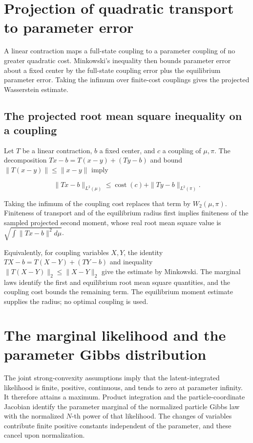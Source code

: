 \documentclass[11pt,a4paper]{article}
\begin{document}
\section{\texorpdfstring{Projection of quadratic transport to parameter error}{Projection of quadratic transport to parameter error}}


A linear contraction maps a full-state coupling to a parameter coupling of no greater quadratic cost. Minkowski’s inequality then bounds parameter error about a fixed center by the full-state coupling error plus the equilibrium parameter error. Taking the infimum over finite-cost couplings gives the projected Wasserstein estimate.



\subsection{\texorpdfstring{The projected root mean square inequality on a coupling}{The projected root mean square inequality on a coupling}}


Let \(T\) be a linear contraction, \(b\) a fixed center, and \(c\) a coupling of \(\mu,\pi\). The decomposition \(Tx-b=T(x-y)+(Ty-b)\) and bound \(\|T(x-y)\|\le\|x-y\|\) imply

\[\|Tx-b\|_{L^2(\mu)}\le\operatorname{cost}(c)+\|Ty-b\|_{L^2(\pi)}.\]

Taking the infimum of the coupling cost replaces that term by \(W_2(\mu,\pi)\). Finiteness of transport and of the equilibrium radius first implies finiteness of the sampled projected second moment, whose real root mean square value is \(\sqrt{\int\|Tx-b\|^2d\mu}\).



Equivalently, for coupling variables \(X,Y\), the identity \(TX-b=T(X-Y)+(TY-b)\) and inequality \(\|T(X-Y)\|_2\le\|X-Y\|_2\) give the estimate by Minkowski. The marginal laws identify the first and equilibrium root mean square quantities, and the coupling cost bounds the remaining term. The equilibrium moment estimate supplies the radius; no optimal coupling is used.



\section{\texorpdfstring{The marginal likelihood and the parameter Gibbs distribution}{The marginal likelihood and the parameter Gibbs distribution}}


The joint strong-convexity assumptions imply that the latent-integrated likelihood is finite, positive, continuous, and tends to zero at parameter infinity. It therefore attains a maximum. Product integration and the particle-coordinate Jacobian identify the parameter marginal of the normalized particle Gibbs law with the normalized \(N\)-th power of that likelihood. The changes of variables contribute finite positive constants independent of the parameter, and these cancel upon normalization.
\end{document}
